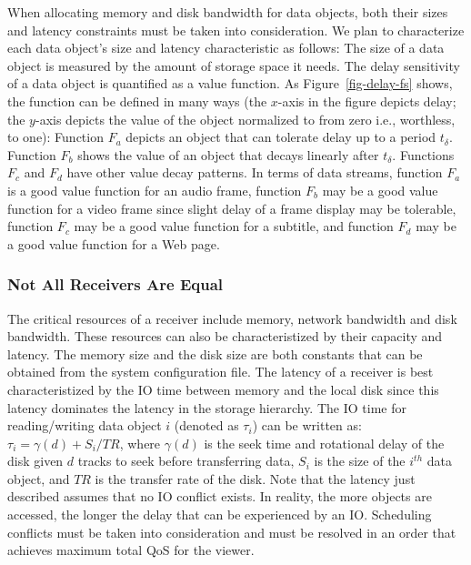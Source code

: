 When allocating memory and disk bandwidth for data objects, both 
their sizes and latency constraints must be taken into consideration.
We plan to characterize each data object's size and latency 
characteristic as follows:
The size of a data object is measured by the 
amount of storage space it needs.
The delay sensitivity of a data object is quantified as
a value function.  
As Figure~\ref{fig-delay-fs} shows, 
the function can be defined in many ways
(the $x$-axis in the figure depicts delay; the $y$-axis
depicts the value of the object normalized to
from zero i.e., worthless, to one): Function $F_a$
depicts an object that can tolerate delay up to a period $t_\delta$.
Function $F_b$ shows the value of an object that decays linearly
after $t_\delta$. Functions $F_c$ and $F_d$ have other
value decay patterns.                                 
In terms of data streams,
function $F_a$ is a good value function for an audio frame,
function $F_b$ may be a good value function for a video
frame since slight delay of a frame display may be tolerable,
function $F_c$ may be a good value function for a subtitle, and
function $F_d$ may be a good value function for a Web page.
                                                       
\subsubsection{Not All Receivers Are Equal}

The critical resources of a receiver include memory,
network bandwidth and disk bandwidth.
These resources can also be characteristized by their
capacity and latency. The memory
size and the disk size
are both constants that
can be obtained from the system configuration file.
The latency of a receiver
is best characteristized by the IO time between memory
and the local disk since this latency dominates the latency
in the storage hierarchy. The IO time for reading/writing
data object $i$ (denoted as $\tau_i$) can be written as:
$\tau_i = \gamma(d) + S_i/TR$,
where $\gamma(d)$ is the seek time and rotational
delay of the disk given $d$ tracks to seek before transferring
data, $S_i$ is the size of the $i^{th}$
data object, and $TR$ is the transfer rate of the disk.
Note that the latency just described
assumes that no IO conflict exists. In reality, the          
more objects are accessed, the longer the delay that
can be experienced by an IO.  
Scheduling conflicts must be taken
into consideration and must be resolved
in an order that achieves maximum total QoS
for the viewer.
                                             
